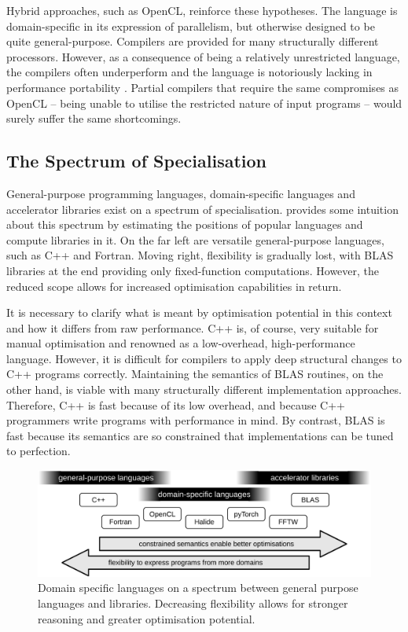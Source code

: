     Hybrid approaches, such as OpenCL, reinforce these hypotheses.
    The language is domain-specific in its expression of parallelism, but
    otherwise designed to be quite general-purpose.
    Compilers are provided for many structurally different processors.
    However, as a consequence of being a relatively unrestricted language, the
    compilers often underperform and the language is notoriously lacking in
    performance portability \citep{Falch:2015:MLB:2863697.2864570}.
    Partial compilers that require the same compromises as OpenCL -- being
    unable to utilise the restricted nature of input programs -- would surely
    suffer the same shortcomings.

\subsection{The Spectrum of Specialisation}

    General-purpose programming languages, domain-specific languages and
    accelerator libraries exist on a spectrum of specialisation.
     provides some intuition about this spectrum by
    estimating the positions of popular languages and compute libraries in it.
    On the far left are versatile general-purpose languages, such as C++ and
    Fortran.
    Moving right, flexibility is gradually lost, with BLAS libraries at
    the end providing only fixed-function computations.
    However, the reduced scope allows for increased optimisation
    capabilities in return.

    It is necessary to clarify what is meant by optimisation potential in this
    context and how it differs from raw performance.
    C++ is, of course, very suitable for manual optimisation and renowned as a
    low-overhead, high-performance language.
    However, it is difficult for compilers to apply deep structural changes to
    C++ programs correctly.
    Maintaining the semantics of BLAS routines, on the other hand, is viable
    with many structurally different implementation approaches.
    Therefore, C++ is fast because of its low overhead, and because C++
    programmers write programs with performance in mind.
    By contrast, BLAS is fast because its semantics are so constrained that
    implementations can be tuned to perfection.

\begin{figure}[t]
\centering
\includegraphics[width=\textwidth]{figures/DSLgradient}
\caption{Domain specific languages on a spectrum between general purpose
         languages and libraries.
         Decreasing flexibility allows for stronger reasoning and greater
         optimisation potential.}
\label{specialgradient}
\end{figure}

